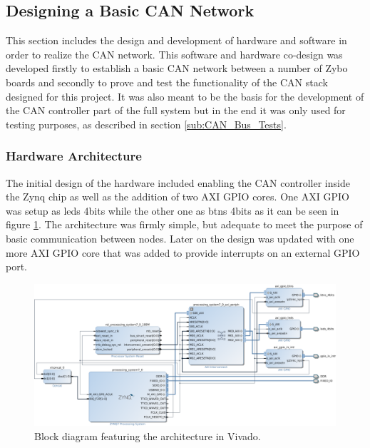 

\subsection{Designing a Basic CAN Network}
\label{sub:TestingCANStack_BareMetal}
This section includes the design and development of hardware and software in order to realize the CAN network.
This software and hardware co-design was developed firstly to establish a basic CAN network between a number of Zybo boards and secondly to prove and test the functionality of the CAN stack designed for this project.
It was also meant to be the basis for the development of the CAN controller part of the full system but in the end it was only used for testing purposes, as described in section \ref{sub:CAN_Bus_Tests}.

\subsubsection{Hardware Architecture}
The initial design of the hardware included enabling the CAN controller inside the Zynq chip as well as the addition of two AXI GPIO cores.
One AXI GPIO was setup as leds 4bits while the other one as btns 4bits as it can be seen in figure \ref{fig:CAN_Testing_Architecture}.
The architecture was firmly simple, but adequate to meet the purpose of basic communication between nodes.
Later on the design was updated with one more AXI GPIO core that was added to provide interrupts on an external GPIO port.

\begin{figure}[h!]
	\centering
	\includegraphics[width = 1.1\linewidth]{graphics/Zybo_BasicTestingArchitecture_for_CAN.png}
	\caption{Block diagram featuring the architecture in Vivado.}
	\label{fig:CAN_Testing_Architecture}
\end{figure}

